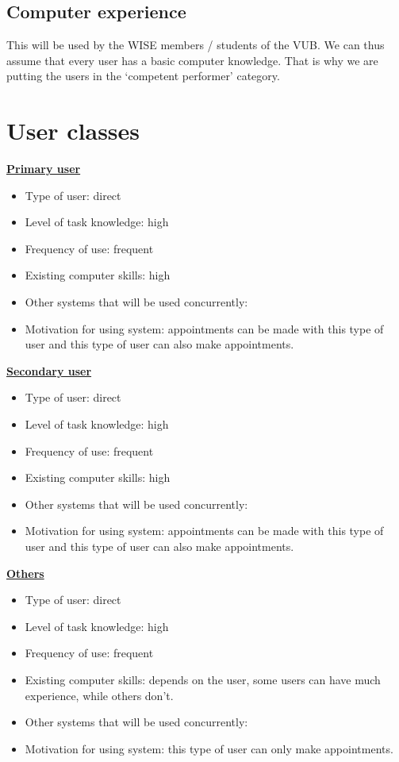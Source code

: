 \documentclass[11pt, a4paper,svglistings]{report}
\begin{document}
\subsection{Computer experience}

This will be used by the WISE members / students of the VUB. We can thus assume that every user has a basic computer knowledge. That is why we are putting the users in the `competent performer' category.


\section{User classes}

\textbf{\underline{Primary user}}
\begin{itemize}
\item Type of user: direct
\item Level of task knowledge: high
\item Frequency of use: frequent  
\item Existing computer skills: high 
\item Other systems that will be used concurrently:
\item Motivation for using system: appointments can be made with this type of user and this type of user can also make appointments.
\end{itemize}
\textbf{\underline{Secondary user}}
\begin{itemize}
\item Type of user: direct
\item  Level of task knowledge: high
\item Frequency of use: frequent
\item Existing computer skills: high 
\item Other systems that will be used concurrently:
\item Motivation for using system: appointments can be made with this type of user and this type of user can also make appointments. 
\end{itemize}
\textbf{\underline{Others}}
\begin{itemize}
\item Type of user: direct
\item Level of task knowledge: high 
\item Frequency of use: frequent 
\item Existing computer skills: depends on the user, some users can have much experience, while others don’t.
\item Other systems that will be used concurrently: 
\item Motivation for using system: this type of user can only make appointments.
\end{itemize}
\end{document}
